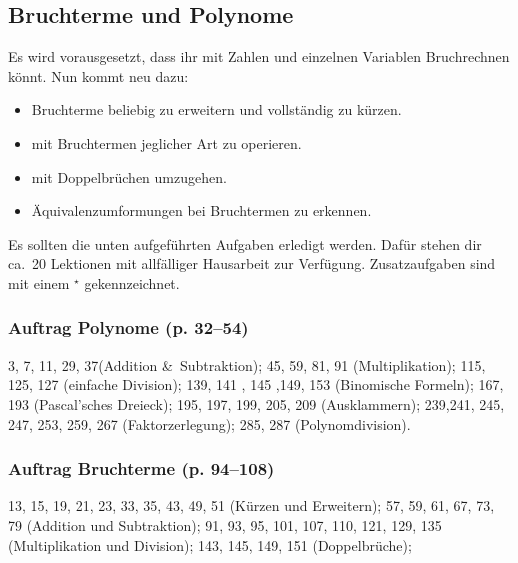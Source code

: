 \documentclass[%
11pt,%
twoside,%
titlepage,%
german,%
]{scrartcl}
\begin{document}
\subsection{Bruchterme und Polynome}
Es wird vorausgesetzt, dass ihr mit Zahlen und einzelnen Variablen Bruchrechnen könnt. Nun kommt neu dazu:

\begin{itemize}
\item Bruchterme beliebig zu erweitern und voll\-st\"an\-dig zu kürzen.
\item mit Bruchtermen jeglicher Art zu operieren.
\item mit Doppelbr\"uchen umzugehen.
\item \"Aquivalenzumformungen bei Bruchtermen zu erkennen.
\end{itemize}

Es sollten die unten aufgef\"uhrten Aufgaben erledigt werden. Daf\"ur stehen dir ca.~20 Lektionen mit allf\"alliger Hausarbeit zur Verf\"ugung. Zusatzaufgaben sind mit einem $^\star$ gekennzeichnet.
\subsubsection{Auftrag Polynome (p. 32--54)}
3, 7, 11, 29, 37(Addition \&\ Subtraktion); 45, 59, 81, 91 (Multiplikation); 115, 125, 127 (einfache Division); 139, 141 , 145 ,149, 153 (Binomische Formeln); 167, 193 (Pascal'sches Dreieck); 195, 197, 199, 205, 209 (Ausklammern); 239,241, 245, 247, 253, 259, 267 (Faktorzerlegung); 285, 287 (Polynomdivision).

\subsubsection{Auftrag Bruchterme (p. 94--108)}
13, 15, 19, 21, 23, 33, 35, 43, 49, 51 (K\"urzen und Erweitern); 57, 59, 61, 67, 73, 79 (Addition und Subtraktion); 91, 93, 95, 101, 107, 110, 121, 129, 135 (Multiplikation und Division); 143, 145, 149, 151 (Doppelbr\"uche);

\clearpage



\end{document}
